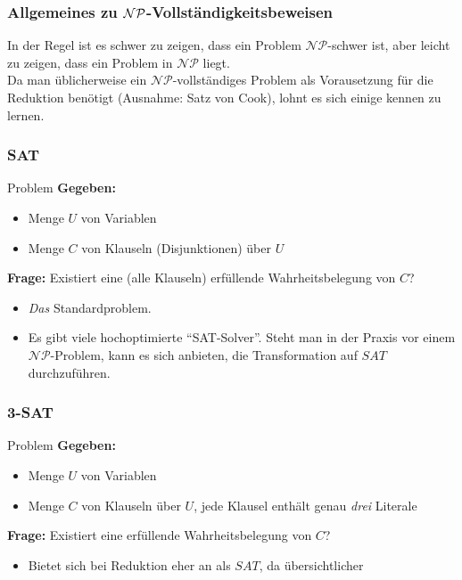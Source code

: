 

\begin{frame}
\frametitle{Allgemeines zu $\mathcal{NP}$-Vollständigkeitsbeweisen}
In der Regel ist es schwer zu zeigen, dass ein Problem $\mathcal{NP}$-schwer ist, aber leicht zu zeigen, dass ein Problem in $\mathcal{NP}$ liegt.\\[8pt]
Da man üblicherweise ein $\mathcal{NP}$-vollständiges Problem als Vorausetzung für die Reduktion benötigt (Ausnahme: Satz von Cook), lohnt es sich einige kennen zu lernen.
\end{frame}

\begin{frame}
\frametitle{SAT}
\begin{block}{Problem}
\textbf{Gegeben:}
\begin{itemize}
 \item Menge $U$ von Variablen
 \item Menge $C$ von Klauseln (Disjunktionen) über $U$
\end{itemize}
\textbf{Frage:} Existiert eine (alle Klauseln) erfüllende Wahrheitsbelegung von $C$?
\end{block}
\begin{itemize}
\item \emph{Das} Standardproblem.
\item Es gibt viele hochoptimierte "`SAT-Solver"'. Steht man in der Praxis vor einem $\mathcal{NP}$-Problem, kann es sich anbieten, die Transformation auf $SAT$ durchzuführen.
\end{itemize}
\end{frame}
\begin{frame}
\frametitle{3-SAT}
\begin{block}{Problem}
\textbf{Gegeben:}
\begin{itemize}
 \item Menge $U$ von Variablen
 \item Menge $C$ von Klauseln über $U$, jede Klausel enthält genau \emph{drei} Literale
\end{itemize}
\textbf{Frage:} Existiert eine erfüllende Wahrheitsbelegung von $C$?
\end{block}
\begin{itemize}
\item Bietet sich bei Reduktion eher an als $SAT$, da übersichtlicher
\end{itemize}
\end{frame}
